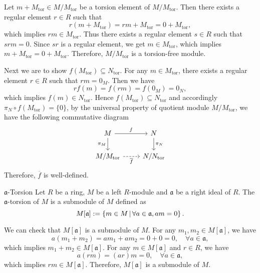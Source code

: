 \begin{prf}
    Let $m+M_{\mathrm{tor}}\in M/M_{\mathrm{tor}}$ be a torsion element of $M/M_{\mathrm{tor}}$. Then there exists a regular element $r\in R$ such that 
    \[
    r\left(m+M_{\mathrm{tor}} \right)=rm+M_{\mathrm{tor}}=0+M_{\mathrm{tor}},
    \]
    which implies $rm\in M_{\mathrm{tor}}$. Thus there exists a regular element $s\in R$ such that $srm=0$. Since $sr$ is a regular element, we get
    $m\in M_{\mathrm{tor}}$, which implies $m+M_{\mathrm{tor}}=0+M_{\mathrm{tor}}$. Therefore, $M/M_{\mathrm{tor}}$ is a torsion-free module.

    Next we are to show $f(M_{\mathrm{tor}})\subseteq N_{\mathrm{tor}}$. For any $m\in M_{\mathrm{tor}}$, there exists a regular element $r\in R$ such that $rm=0_M$. Then we have
    \[
        rf(m)=f(rm)=f(0_M)=0_N,
    \]
    which implies $f(m)\in N_{\mathrm{tor}}$. Hence $f(M_{\mathrm{tor}})\subseteq N_{\mathrm{tor}}$ and accordingly $\pi_N\circ f(M_{\mathrm{tor}})=\{0\}$, by the universal property of quotient module $M/M_{\mathrm{tor}}$, we have the following commutative diagram
    \[
        \begin{tikzcd}
            M \arrow[r, "f"] \arrow[d, "\pi_M"'] & N \arrow[d, "\pi_N"] \\
            M/M_{\mathrm{tor}} \arrow[r, "\overline{f}"', dashed] & N/N_{\mathrm{tor}}
        \end{tikzcd}
    \]
    Therefore, $\overline{f}$ is well-defined.
\end{prf}



\begin{definition}{$\mathfrak{a}$-Torsion}{}
    Let $R$ be a ring, $M$ be a left $R$-module and $\mathfrak{a}$ be a right ideal of $R$. The $\mathfrak{a}$-torsion of $M$ is a submodule of $M$ defined as
    \[
        M[\mathfrak{a}]:=\left\{m\in M\,\middle\vert\, \forall a\in \mathfrak{a}, am=0\right\}.
    \]
\end{definition}
\begin{prf}
    We can check that $M[\mathfrak{a}]$ is a submodule of $M$. For any $m_1, m_2\in M[\mathfrak{a}]$, we have
    \[
        a(m_1+m_2)=am_1+am_2=0+0=0,\quad \forall a\in \mathfrak{a},
    \]
    which implies $m_1+m_2\in M[\mathfrak{a}]$. For any $m\in M[\mathfrak{a}]$ and $r\in R$, we have
    \[
        a(rm)=(ar)m=0,\quad \forall a\in \mathfrak{a},
    \]
    which implies $rm\in M[\mathfrak{a}]$. Therefore, $M[\mathfrak{a}]$ is a submodule of $M$.
\end{prf}

